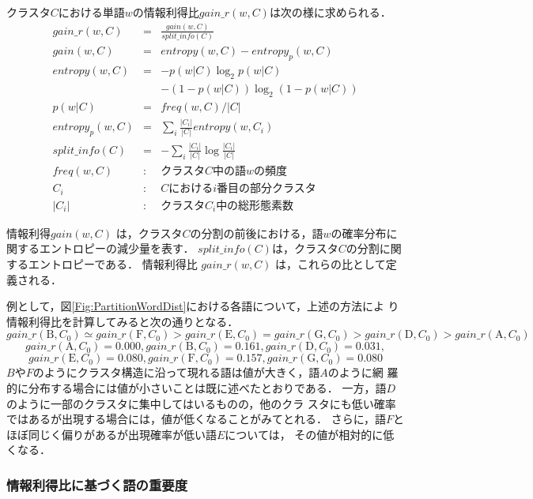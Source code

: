 クラスタ$C$における単語$w$の情報利得比$gain\_r(w,C)$は次の様に求められる．
\begin{eqnarray}
 gain\_r(w,C) & = & \frac{gain(w,C)}{split\_info(C)} \label{Eq:IGR}\\
 gain(w,C) & = & entropy(w,C) - entropy_{p}(w,C)\nonumber\\
 entropy(w,C) & = & -p(w|C)\log_2 p(w|C) \nonumber\\
           &   & - (1-p(w|C))\log_2 (1-p(w|C))\nonumber\\
 p(w|C)    & = & freq(w,C)/|C|\nonumber\\
 entropy_{p}(w,C) & = & \sum_{i} \frac{|C_i|}{|C|} entropy(w,C_i)\nonumber\\
 split\_info(C) & = & - \sum_{i} \frac{|C_i|}{|C|} \log  \frac{|C_i|}{|C|}\nonumber\\
 freq(w,C) & : & \mbox{クラスタ$C$中の語$w$の頻度}\nonumber\\
 C_i & : & \mbox{$C$における$i$番目の部分クラスタ}\nonumber\\
 |C_i| & :& \mbox{クラスタ$C_i$中の総形態素数}\nonumber
\end{eqnarray}

情報利得$gain(w,C)$ は，クラスタ$C$の分割の前後における，語$w$の確率分布に関するエントロピーの減少量を表す．
$split\_info(C)$は，クラスタ$C$の分割に関するエントロピーである．
情報利得比 $gain\_r(w,C)$ は，これらの比として定義される．

例として，図\ref{Fig:PartitionWordDist}における各語について，上述の方法によ
り情報利得比を計算してみると次の通りとなる．
{\small
\[
 gain\_r(\mbox{B},C_0) \simeq gain\_r(\mbox{F},C_0) >
 gain\_r(\mbox{E},C_0) = gain\_r(\mbox{G},C_0) > gain\_r(\mbox{D},C_0) >
 gain\_r(\mbox{A},C_0)
\]
\[
 gain\_r(\mbox{A},C_0) = 0.000,
 gain\_r(\mbox{B},C_0) = 0.161,
 gain\_r(\mbox{D},C_0) = 0.031,
\]
\[
 gain\_r(\mbox{E},C_0) = 0.080,
 gain\_r(\mbox{F},C_0) = 0.157,
 gain\_r(\mbox{G},C_0) = 0.080
\]
}
$B$や$F$のようにクラスタ構造に沿って現れる語は値が大きく，語$A$のように網
羅的に分布する場合には値が小さいことは既に述べたとおりである．
一方，語$D$のように一部のクラスタに集中してはいるものの，他のクラ
スタにも低い確率ではあるが出現する場合には，値が低くなることがみてとれる．
さらに，語$F$とほぼ同じく偏りがあるが出現確率が低い語$E$については，
その値が相対的に低くなる．

\subsubsection{情報利得比に基づく語の重要度}

